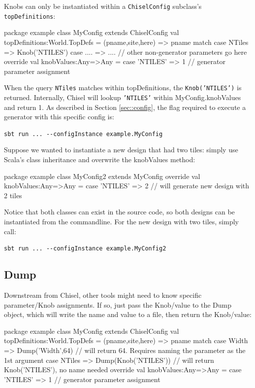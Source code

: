 \documentclass[10pt,twocolumn]{article}
\def\code#1{{\small\tt #1}}
\begin{document}
Knobs can only be instantiated within a \code{ChiselConfig} subclass's \code{topDefinitions}:

\begin{scala}
package example
class MyConfig extends ChiselConfig {
  val topDefinitions:World.TopDefs = {
    (pname,site,here) => pname match {
      case NTiles => Knob('NTILES')
      case .... => .... // other non-generator parameters go here
    }
  }
  override val knobValues:Any=>Any = {
    case 'NTILES' => 1 // generator parameter assignment
  }
}
\end{scala}

When the query \code{NTiles} matches within topDefinitions, the \code{Knob('NTILES')} is returned. Internally, Chisel will lookup \code{'NTILES'} within MyConfig.knobValues and return 1. As described in Section \ref{sec::config}, the flag required to execute a generator with this specific config is:

\code{sbt run ... -{-}configInstance example.MyConfig}

Suppose we wanted to instantiate a new design that had two tiles: simply use Scala's class inheritance and overwrite the knobValues method:

\begin{scala}
package example
class MyConfig2 extends MyConfig {
  override val knobValues:Any=>Any = {
    case 'NTILES' => 2 // will generate new design with 2 tiles
  }
}
\end{scala}

Notice that both classes can exist in the source code, so both designs can be instantiated from the commandline. For the new design with two tiles, simply call:

\code{sbt run ... -{-}configInstance example.MyConfig2}

\subsection{Dump}

Downstream from Chisel, other tools might need to know specific parameter/Knob assignments. If so, just pass the Knob/value to the Dump object, which will write the name and value to a file, then return the Knob/value:

\begin{scala}
package example
class MyConfig extends ChiselConfig {
  val topDefinitions:World.TopDefs = {
    (pname,site,here) => pname match {
      case Width => Dump('Width',64) // will return 64. Requires naming the parameter as the 1st argument
      case NTiles => Dump(Knob('NTILES')) // will return Knob('NTILES'), no name needed
    }
  }
  override val knobValues:Any=>Any = {
    case 'NTILES' => 1 // generator parameter assignment
  }
}
\end{scala}
\end{document}

